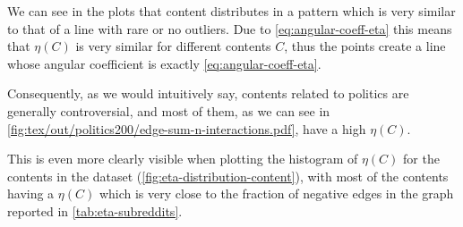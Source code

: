 We can see in the plots that content distributes in a pattern which is very
similar to that of a line with rare or no outliers. Due to
\eqref{eq:angular-coeff-eta} this means that $\eta(C)$ is very similar for
different contents $C$, thus the points create a line whose angular coefficient
is exactly \eqref{eq:angular-coeff-eta}.

Consequently, as we would intuitively say, contents related
to politics are generally controversial, and most of them, as we can see
in \autoref{fig:tex/out/politics200/edge-sum-n-interactions.pdf}, have a high
$\eta(C)$.

This is even more clearly visible when plotting the histogram of $\eta(C)$ for the contents in the dataset
(\autoref{fig:eta-distribution-content}), with most of the contents having a
$\eta(C)$ which is very close to the fraction of negative edges in the graph
reported in \autoref{tab:eta-subreddits}.

